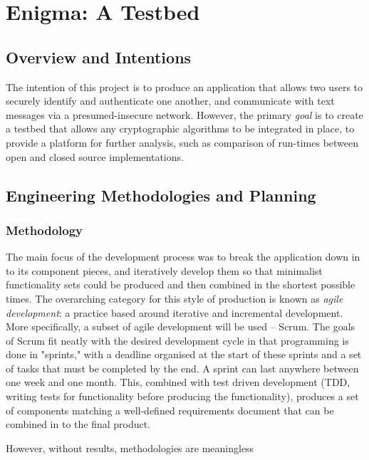 
\chapter{Enigma: A Testbed} 
\label{Chapter6}

\section{Overview and Intentions}

The intention of this project is to produce an application that allows two users to securely identify and authenticate one another, and communicate with text messages via a presumed-insecure network. However, the primary \emph{goal} is to create a testbed that allows any cryptographic algorithms to be integrated in place, to provide a platform for further analysis, such as comparison of run-times between open and closed source implementations.

\section{Engineering Methodologies and Planning}

\subsection{Methodology}

The main focus of the development process was to break the application down in to its component pieces, and iteratively develop them so that minimalist functionality sets could be produced and then combined in the shortest possible times. The overarching category for this style of production is known as \emph{agile development}: a practice based around iterative and incremental development. More specifically, a subset of agile development will be used -- Scrum. The goals of Scrum fit neatly with the desired development cycle in that programming is done in "sprints," with a deadline organised at the start of these sprints and a set of tasks that must be completed by the end. A sprint can last anywhere between one week and one month. This, combined with test driven development (TDD, writing tests for functionality before producing the functionality), produces a set of components matching a well-defined requirements document that can be combined in to the final product.

However, without results, methodologies are meaningless

